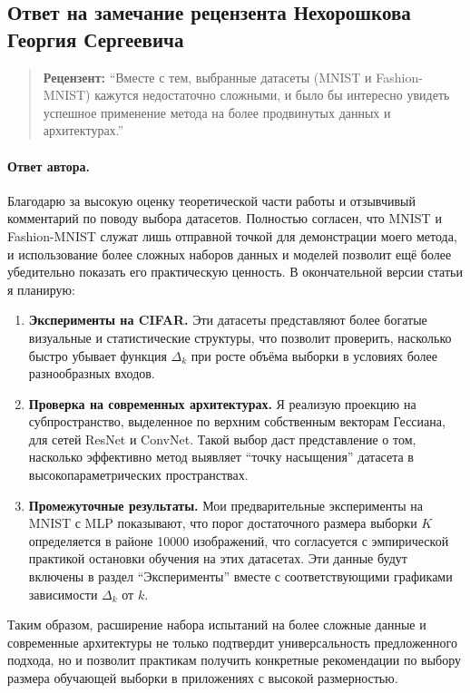 \documentclass[11pt]{article}
\begin{document}
\pagestyle{empty}

\begin{center}
    \subsection*{Ответ на замечание рецензента Нехорошкова Георгия Сергеевича}
\end{center}

\begin{quote}
    \textbf{Рецензент:}
    ``Вместе с тем, выбранные датасеты (MNIST и Fashion-MNIST) кажутся недостаточно сложными, и было бы интересно увидеть 
    успешное применение метода на более продвинутых данных и архитектурах.''
\end{quote}

\paragraph{Ответ автора.}
Благодарю за высокую оценку теоретической части работы и отзывчивый комментарий по поводу выбора датасетов. Полностью 
согласен, что MNIST и Fashion-MNIST служат лишь отправной точкой для демонстрации моего метода, и использование более 
сложных наборов данных и моделей позволит ещё более убедительно показать его практическую ценность. В окончательной версии 
статьи я планирую:

\begin{enumerate}
    \item \textbf{Эксперименты на CIFAR.}
          Эти датасеты представляют более богатые визуальные и статистические структуры, что позволит проверить, насколько 
          быстро убывает функция $\Delta_k$ при росте объёма выборки в условиях более разнообразных входов.
    \item \textbf{Проверка на современных архитектурах.}
          Я реализую проекцию на субпространство, выделенное по верхним собственным векторам Гессиана, для сетей 
          ResNet и ConvNet. Такой выбор даст представление о том, насколько эффективно метод выявляет ``точку насыщения'' 
          датасета в высокопараметрических пространствах.
    \item \textbf{Промежуточные результаты.}
          Мои предварительные эксперименты на MNIST с MLP показывают, что порог достаточного размера выборки 
          $K$ определяется в районе 10000 изображений, что согласуется с эмпирической практикой остановки обучения 
          на этих датасетах. Эти данные будут включены в раздел ``Эксперименты'' вместе с соответствующими графиками 
          зависимости $\Delta_k$ от $k$.
\end{enumerate}

Таким образом, расширение набора испытаний на более сложные данные и современные архитектуры не только подтвердит 
универсальность предложенного подхода, но и позволит практикам получить конкретные рекомендации по выбору размера обучающей 
выборки в приложениях с высокой размерностью.
\end{document}
